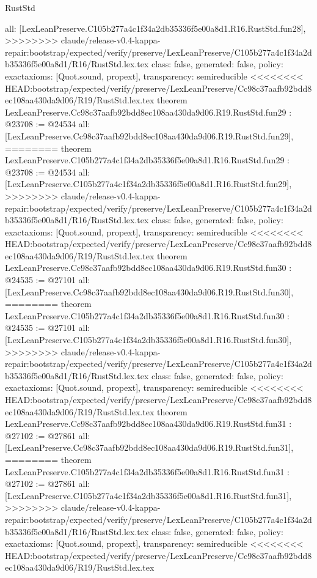 \begin{lexlean}{RustStd}
\begin{coremodule}
{\begin{coremodule}
{{{{{{{{{{{{{{{{{{{{{{{{{{{{{{{{  all: [LexLeanPreserve.C105b277a4c1f34a2db35336f5e00a8d1.R16.RustStd.fun28],
>>>>>>>> claude/release-v0.4-kappa-repair:bootstrap/expected/verify/preserve/LexLeanPreserve/C105b277a4c1f34a2db35336f5e00a8d1/R16/RustStd.lex.tex
  class: false,
  generated: false,
  policy: exact{axioms: [Quot.sound, propext]},
  transparency: semireducible
}
<<<<<<<< HEAD:bootstrap/expected/verify/preserve/LexLeanPreserve/Cc98c37aafb92bdd8ec108aa430da9d06/R19/RustStd.lex.tex
theorem LexLeanPreserve.Cc98c37aafb92bdd8ec108aa430da9d06.R19.RustStd.fun29 : @23708 := @24534 {
  all: [LexLeanPreserve.Cc98c37aafb92bdd8ec108aa430da9d06.R19.RustStd.fun29],
========
theorem LexLeanPreserve.C105b277a4c1f34a2db35336f5e00a8d1.R16.RustStd.fun29 : @23708 := @24534 {
  all: [LexLeanPreserve.C105b277a4c1f34a2db35336f5e00a8d1.R16.RustStd.fun29],
>>>>>>>> claude/release-v0.4-kappa-repair:bootstrap/expected/verify/preserve/LexLeanPreserve/C105b277a4c1f34a2db35336f5e00a8d1/R16/RustStd.lex.tex
  class: false,
  generated: false,
  policy: exact{axioms: [Quot.sound, propext]},
  transparency: semireducible
}
<<<<<<<< HEAD:bootstrap/expected/verify/preserve/LexLeanPreserve/Cc98c37aafb92bdd8ec108aa430da9d06/R19/RustStd.lex.tex
theorem LexLeanPreserve.Cc98c37aafb92bdd8ec108aa430da9d06.R19.RustStd.fun30 : @24535 := @27101 {
  all: [LexLeanPreserve.Cc98c37aafb92bdd8ec108aa430da9d06.R19.RustStd.fun30],
========
theorem LexLeanPreserve.C105b277a4c1f34a2db35336f5e00a8d1.R16.RustStd.fun30 : @24535 := @27101 {
  all: [LexLeanPreserve.C105b277a4c1f34a2db35336f5e00a8d1.R16.RustStd.fun30],
>>>>>>>> claude/release-v0.4-kappa-repair:bootstrap/expected/verify/preserve/LexLeanPreserve/C105b277a4c1f34a2db35336f5e00a8d1/R16/RustStd.lex.tex
  class: false,
  generated: false,
  policy: exact{axioms: [Quot.sound, propext]},
  transparency: semireducible
}
<<<<<<<< HEAD:bootstrap/expected/verify/preserve/LexLeanPreserve/Cc98c37aafb92bdd8ec108aa430da9d06/R19/RustStd.lex.tex
theorem LexLeanPreserve.Cc98c37aafb92bdd8ec108aa430da9d06.R19.RustStd.fun31 : @27102 := @27861 {
  all: [LexLeanPreserve.Cc98c37aafb92bdd8ec108aa430da9d06.R19.RustStd.fun31],
========
theorem LexLeanPreserve.C105b277a4c1f34a2db35336f5e00a8d1.R16.RustStd.fun31 : @27102 := @27861 {
  all: [LexLeanPreserve.C105b277a4c1f34a2db35336f5e00a8d1.R16.RustStd.fun31],
>>>>>>>> claude/release-v0.4-kappa-repair:bootstrap/expected/verify/preserve/LexLeanPreserve/C105b277a4c1f34a2db35336f5e00a8d1/R16/RustStd.lex.tex
  class: false,
  generated: false,
  policy: exact{axioms: [Quot.sound, propext]},
  transparency: semireducible
}
<<<<<<<< HEAD:bootstrap/expected/verify/preserve/LexLeanPreserve/Cc98c37aafb92bdd8ec108aa430da9d06/R19/RustStd.lex.tex
}}}}}}}}}}}}}}}}}}}}}}}}}}}}}}}}}}
\end{coremodule}}
\end{coremodule}
\end{lexlean}
